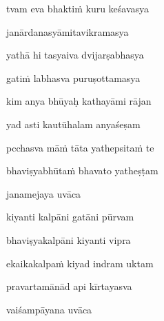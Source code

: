 \ujvers\nemsloka 
tvam eva bhaktiṁ kuru keśavasya
\dontdisplaylinenum

\nemslokab 
janārdanasyāmitavikramasya \danda\dontdisplaylinenum

\nemslokac 
yathā hi tasyaiva dvijarṣabhasya
\dontdisplaylinenum

\nemslokad 
gatiṁ labhasva puruṣottamasya \veg\dontdisplaylinenum
{}

\ujvers\nemsloka 
kim anya bhūyaḥ kathayāmi rājan
\dontdisplaylinenum

\nemslokab 
yad asti kautūhalam anyaśeṣam \danda\dontdisplaylinenum

\nemslokac 
pcchasva māṁ tāta yathepsitaṁ te
\dontdisplaylinenum

\nemslokad 
bhaviṣyabhūtaṁ bhavato yatheṣṭam \veg\dontdisplaylinenum

\vers
{}

janamejaya uvāca~{\dandab}\dontdisplaylinenum 
{}

\nemsloka 
kiyanti kalpāni gatāni pūrvam
\dontdisplaylinenum

\nemslokab 
bhaviṣyakalpāni kiyanti vipra \danda\dontdisplaylinenum

\nemslokac 
ekaikakalpaṁ kiyad indram uktam
\dontdisplaylinenum

\nemslokad 
pravartamānād api kīrtayasva \veg\dontdisplaylinenum

\vers
{}

vaiśampāyana uvāca~{\dandab}\dontdisplaylinenum 
{}

